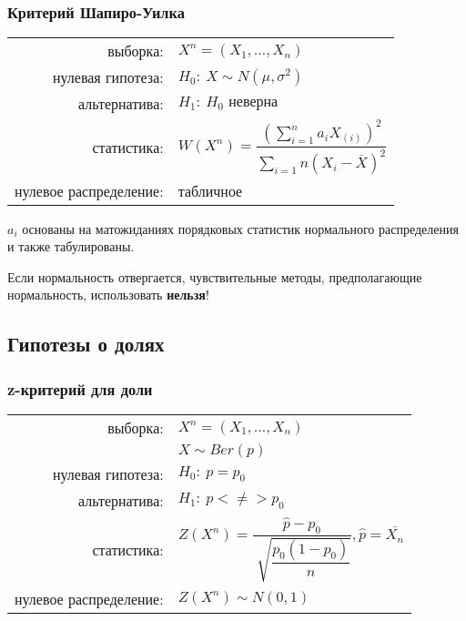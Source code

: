 \documentclass[a4paper,12pt]{article}
\begin{document}
\pagebreak

\subsubsection{Критерий Шапиро-Уилка}

\begin{table}[h]
	\begin{tabular}{rl}
выборка:& $ X^{n} = \left( X_{1}, \ldots, X_{n} \right) $ \\
нулевая гипотеза: & $ H_{0}:~X \sim N( \mu, \sigma^{2}) $ \\
альтернатива: & $ H_{1}:~H_{0}\text{ неверна} $ \\
статистика: & $ W\left( X^{n} \right) = \dfrac{ \left( \sum\limits_{i=1}^{n} a_{i} X_{(i)} \right)^{2} }{ \sum\limits_{i=1}{n} (X_{i} - \overline{X} )^{2} } $ \\
нулевое распределение: & табличное
	\end{tabular}
\end{table}

$a_{i}$ основаны на матожиданиях порядковых статистик нормального распределения и также табулированы.

Если нормальность отвергается, чувствительные методы, предполагающие нормальность, использовать \textbf{нельзя}!

\pagebreak

\subsection{Гипотезы о долях}

\subsubsection{z-критерий для доли}

\begin{table}[h]
	\begin{tabular}{rl}
выборка:& $ X^{n} = \left( X_{1}, \ldots, X_{n} \right) $ \\
& $ X \sim Ber(p)  $ \\
нулевая гипотеза: & $ H_{0}:~p = p_{0} $ \\
альтернатива: & $ H_{1}:~p <\neq> p_{0} $ \\
статистика: & $ Z \left( X^{n} \right) = \dfrac{ \hat{p} - p_{0} }{ \sqrt[]{\dfrac{ p_{0}(1-p_{0}) }{n}} }, \hat{p} = \overline{X_{n}} $ \\
нулевое распределение: & $ Z\left( X^{n} \right) \sim N( 0, 1) $
	\end{tabular}
\end{table}
\end{document}

